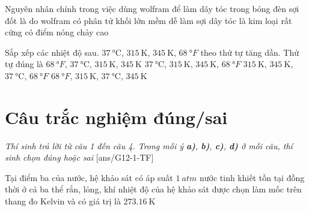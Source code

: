 \begin{ex}
	Nguyên nhân chính trong việc dùng wolfram để làm dây tóc trong bóng đèn sợi đốt là do wolfram
	\choice
	{có phân tử khối lớn}
	{mềm dễ làm sợi dây tóc}
	{là kim loại rất cứng}
	{\True có điểm nóng chảy cao}
	\loigiai{}
\end{ex}
\begin{ex}
	Sắp xếp các nhiệt độ sau. $\SI{37}{\celsius}$, $\SI{315}{\kelvin}$, $\SI{345}{\kelvin}$, $\SI{68}{\degree F}$ theo thứ tự tăng dần. Thứ tự đúng là
	\choice
	{\True $\SI{68}{\degree F}$, $\SI{37}{\celsius}$, $\SI{315}{\kelvin}$, $\SI{345}{\kelvin}$}
	{$\SI{37}{\celsius}$,  $\SI{315}{\kelvin}$, $\SI{345}{\kelvin}$, $\SI{68}{\degree F}$}
	{$\SI{315}{\kelvin}$,  $\SI{345}{\kelvin}$, $\SI{37}{\celsius}$, $\SI{68}{\degree F}$}
	{$\SI{68}{\degree F}$, $\SI{315}{\kelvin}$, $\SI{37}{\celsius}$, $\SI{345}{\kelvin}$}
	\loigiai{}
\end{ex}
\section{Câu trắc nghiệm đúng/sai} 
\textit{Thí sinh trả lời từ câu 1 đến câu 4. Trong mỗi ý \textbf{a)}, \textbf{b)}, \textbf{c)}, \textbf{d)} ở mỗi câu, thí sinh chọn đúng hoặc sai}
\setcounter{ex}{0}
[ans/G12-1-TF]
\begin{ex}
	Tại điểm ba của nước,	
	{hệ khảo sát có áp suất $\SI{1}{atm}$}
	{\True nước tinh khiết tồn tại đồng thời ở cả ba thể rắn, lỏng, khí}
	{\True nhiệt độ của hệ khảo sát được chọn làm mốc trên thang đo Kelvin và có giá trị là $\SI{273.16}{\kelvin}$}
\end{ex}


